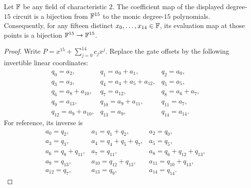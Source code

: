\begin{lemma}
\label{lem:char2-degree15-inverse}
Let $\mathbb{F}$ be any field of characteristic $2$.  The coefficient map of
the displayed degree-$15$ circuit is a bijection from $\mathbb{F}^{15}$ to the monic
degree-$15$ polynomials.  Consequently, for any fifteen distinct
$x_0,\ldots,x_{14}\in\mathbb{F}$, its evaluation map at those points is a bijection
$\mathbb{F}^{15}\to\mathbb{F}^{15}$.
\end{lemma}
\begin{proof}
Write $P=x^{15}+\sum_{j=0}^{14}c_jx^j$.  Replace the gate offsets by the
following invertible linear coordinates:
\[
\begin{array}{lll}
q_0=a_2, & q_1=a_0+a_1, & q_2=a_0,\\
q_3=a_3, & q_4=a_4+a_5+a_{12}, & q_5=a_5,\\
q_6=a_8+a_{10}, & q_7=a_{12}, & q_8=a_6+a_7,\\
q_9=a_{13}, & q_{10}=a_9+a_{11}, & q_{11}=a_7,\\
q_{12}=a_9+a_{10}, & q_{13}=a_9, & q_{14}=a_{14}.
\end{array}                                                       \tag{A.1}
\]
For reference, its inverse is
\[
\begin{array}{lll}
a_0=q_2, & a_1=q_1+q_2, & a_2=q_0,\\
a_3=q_3, & a_4=q_4+q_5+q_7, & a_5=q_5,\\
a_6=q_8+q_{11}, & a_7=q_{11},
  & a_8=q_6+q_{12}+q_{13},\\
a_9=q_{13}, & a_{10}=q_{12}+q_{13},
  & a_{11}=q_{10}+q_{13},\\
a_{12}=q_7, & a_{13}=q_9, & a_{14}=q_{14}.
\end{array}                                                       \tag{A.2}\label{eq:char2-15-q-inverse}
\]


\end{proof}

